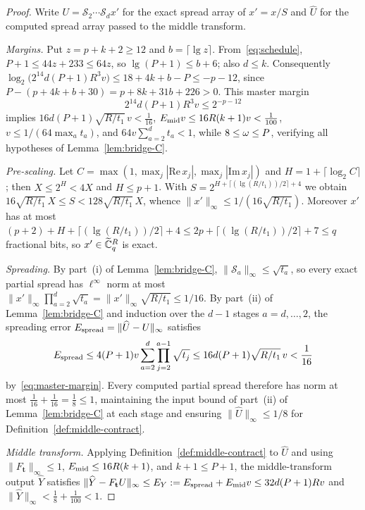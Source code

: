 \begin{proof}
Write $U=\mathcal S_2\cdots\mathcal S_d x'$ for the exact spread array of $x'=x/S$ and $\widehat U$ for the computed
spread array passed to the middle transform.

\emph{Margins.} Put $z=p+k+2\ge 12$ and $b=\lceil\lg z\rceil$. From~\eqref{eq:schedule}, $P+1\le 44z+233\le 64z$, so
$\lg(P+1)\le b+6$; also $d\le k$. Consequently
$\log_2\bigl(2^{14}d(P+1)R^3 v\bigr)\le 18+4k+b-P\le -p-12$, since $P-(p+4k+b+30)=p+8k+31b+226>0$. This master margin
\begin{equation}\label{eq:master-margin}
  2^{14}d(P+1)R^3 v\le 2^{-p-12}
\end{equation}
implies $16d(P+1)\sqrt{R/t_1}\,v<\frac{1}{16}$, $E_{\rm mid}v\le 16R(k+1)v<\frac{1}{100}$,
$v\le 1/(64\max_a t_a)$, and $64v\sum_{a=2}^d t_a<1$, while $8\le\omega\le P$, verifying all hypotheses of
Lemma~\ref{lem:bridge-C}.

\emph{Pre-scaling.} Let $C=\max(1,\max_j|\mathrm{Re}\,x_j|,\max_j|\mathrm{Im}\,x_j|)$ and $H=1+\lceil\log_2 C\rceil$;
then $X\le 2^H<4X$ and $H\le p+1$. With $S=2^{H+\lceil(\lg(R/t_1))/2\rceil+4}$ we obtain
$16\sqrt{R/t_1}\,X\le S<128\sqrt{R/t_1}\,X$, whence $\|x'\|_\infty\le 1/(16\sqrt{R/t_1})$. Moreover $x'$ has at most
$(p+2)+H+\lceil(\lg(R/t_1))/2\rceil+4\le 2p+\lceil(\lg(R/t_1))/2\rceil+7\le q$ fractional bits, so $x'\in\widetilde{\mathbb{C}}_q^R$ is
exact.

\emph{Spreading.} By part~(i) of Lemma~\ref{lem:bridge-C}, $\|\mathcal S_a\|_\infty\le\sqrt{t_a}$, so every exact partial
spread has $\ell^\infty$ norm at most $\|x'\|_\infty\prod_{a=2}^d\sqrt{t_a}=\|x'\|_\infty\sqrt{R/t_1}\le 1/16$. By
part~(ii) of Lemma~\ref{lem:bridge-C} and induction over the $d-1$ stages $a=d,\dots,2$, the spreading error
$E_{\rm spread}=\|\widehat U-U\|_\infty$ satisfies
\[
  E_{\rm spread}\le 4(P+1)v\sum_{a=2}^d\prod_{j=2}^{a-1}\sqrt{t_j}\le 16d(P+1)\sqrt{R/t_1}\,v<\frac{1}{16}
\]
by~\eqref{eq:master-margin}. Every computed partial spread therefore has norm at most $\frac{1}{16}+\frac{1}{16}=\frac18\le 1$,
maintaining the input bound of part~(ii) of Lemma~\ref{lem:bridge-C} at each stage and ensuring
$\|\widehat U\|_\infty\le 1/8$ for Definition~\ref{def:middle-contract}.

\emph{Middle transform.} Applying Definition~\ref{def:middle-contract} to $\widehat U$ and using
$\|F_{\mathbf t}\|_\infty\le 1$, $E_{\rm mid}\le 16R(k+1)$, and $k+1\le P+1$, the middle-transform output $\widehat Y$
satisfies $\|\widehat Y-F_{\mathbf t}U\|_\infty\le E_Y:=E_{\rm spread}+E_{\rm mid}v\le 32d(P+1)Rv$ and
$\|\widehat Y\|_\infty<\frac18+\frac{1}{100}<1$.


\end{proof}
